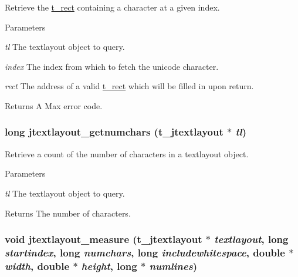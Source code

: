 Retrieve the \hyperlink{structt__rect}{t\_\-rect} containing a character at a given index. 
\begin{DoxyParams}{Parameters}
\item[{\em tl}]The textlayout object to query. \item[{\em index}]The index from which to fetch the unicode character. \item[{\em rect}]The address of a valid \hyperlink{structt__rect}{t\_\-rect} which will be filled in upon return. \end{DoxyParams}
\begin{DoxyReturn}{Returns}
A Max error code. 
\end{DoxyReturn}
\hypertarget{group__textlayout_ga3a3518a4148d81d2a2aae24e5d60ea24}{
\subsubsection[{jtextlayout\_\-getnumchars}]{\setlength{\rightskip}{0pt plus 5cm}long jtextlayout\_\-getnumchars ({\bf t\_\-jtextlayout} $\ast$ {\em tl})}}
\label{group__textlayout_ga3a3518a4148d81d2a2aae24e5d60ea24}


Retrieve a count of the number of characters in a textlayout object. 
\begin{DoxyParams}{Parameters}
\item[{\em tl}]The textlayout object to query. \end{DoxyParams}
\begin{DoxyReturn}{Returns}
The number of characters. 
\end{DoxyReturn}
\hypertarget{group__textlayout_gadf112c6c73177263fd276732f237871f}{
\subsubsection[{jtextlayout\_\-measure}]{\setlength{\rightskip}{0pt plus 5cm}void jtextlayout\_\-measure ({\bf t\_\-jtextlayout} $\ast$ {\em textlayout}, \/  long {\em startindex}, \/  long {\em numchars}, \/  long {\em includewhitespace}, \/  double $\ast$ {\em width}, \/  double $\ast$ {\em height}, \/  long $\ast$ {\em numlines})}}
\label{group__textlayout_gadf112c6c73177263fd276732f237871f}


